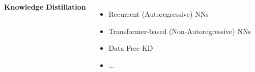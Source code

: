 \begin{frame}
\begin{columns}
            \textbf{Knowledge Distillation}
                \begin{itemize}
                \item Recurrent (Autoregressive) NNs
                \item Transformer-based (Non-Autoregressive) NNs
                \item Data Free KD
                \item ...
                \end{itemize}

        \end{columns}
\end{frame}
